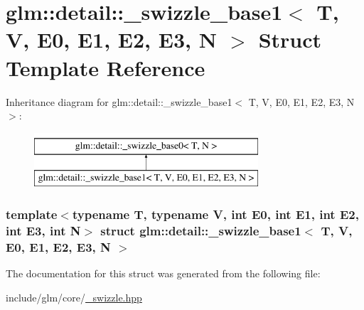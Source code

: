 \hypertarget{structglm_1_1detail_1_1__swizzle__base1}{\section{glm\-:\-:detail\-:\-:\-\_\-swizzle\-\_\-base1$<$ \-T, \-V, \-E0, \-E1, \-E2, \-E3, \-N $>$ \-Struct \-Template \-Reference}
\label{structglm_1_1detail_1_1__swizzle__base1}
}
\-Inheritance diagram for glm\-:\-:detail\-:\-:\-\_\-swizzle\-\_\-base1$<$ \-T, \-V, \-E0, \-E1, \-E2, \-E3, \-N $>$\-:\begin{figure}[H]
\begin{center}
\leavevmode
\includegraphics[height=2.000000cm]{structglm_1_1detail_1_1__swizzle__base1}
\end{center}
\end{figure}
\subsubsection*{template$<$typename \-T, typename \-V, int \-E0, int \-E1, int \-E2, int \-E3, int \-N$>$ struct glm\-::detail\-::\-\_\-swizzle\-\_\-base1$<$ T, V, E0, E1, E2, E3, N $>$}



\-The documentation for this struct was generated from the following file\-:\begin{DoxyCompactItemize}
\item 
include/glm/core/\hyperlink{__swizzle_8hpp}{\-\_\-swizzle.\-hpp}\end{DoxyCompactItemize}
